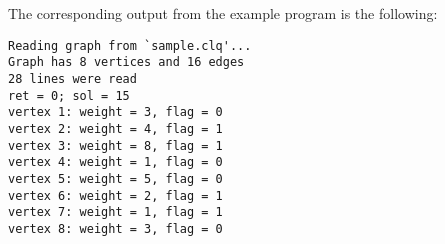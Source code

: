 \documentclass[dvipdfm,11pt]{report}
\begin{document}
\noindent
The corresponding output from the example program is the following:

\begin{footnotesize}
\begin{verbatim}
Reading graph from `sample.clq'...
Graph has 8 vertices and 16 edges
28 lines were read
ret = 0; sol = 15
vertex 1: weight = 3, flag = 0
vertex 2: weight = 4, flag = 1
vertex 3: weight = 8, flag = 1
vertex 4: weight = 1, flag = 0
vertex 5: weight = 5, flag = 0
vertex 6: weight = 2, flag = 1
vertex 7: weight = 1, flag = 1
vertex 8: weight = 3, flag = 0
\end{verbatim}
\end{footnotesize}
\end{document}
